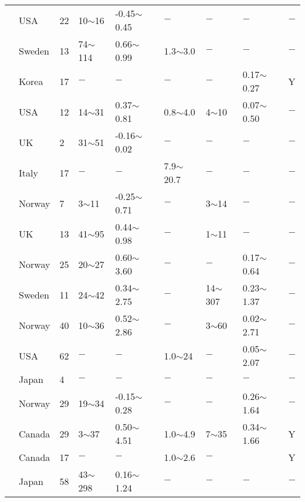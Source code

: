 {\begin{longtable}{lllllllll}
    \citet{Holtz19721223} & USA   & 22    & 10$\sim$16 & -0.45$\sim$0.45 & $-$     & $-$     & $-$     & $-$ \\
    \citet{Holtz197979} & Sweden & 13    & 74$\sim$114 & 0.66$\sim$0.99 & 1.3$\sim$3.0 & $-$     & $-$     & $-$ \\
    \citet{Hong20102} & Korea & 17    & $-$     & $-$     & $-$     & $-$     & 0.17$\sim$0.27 & Y \\
    \citet{Horn1964215} & USA   & 12    & 14$\sim$31 & 0.37$\sim$0.81 & 0.8$\sim$4.0 & 4$\sim$10  & 0.07$\sim$0.50 & $-$ \\
    \citet{Hutchinson19696} & UK    & 2     & 31$\sim$51 & -0.16$\sim$0.02 & $-$     & $-$     & $-$     & $-$ \\
    \citet{Jamiolkowski1988263} & Italy & 17    & $-$     & $-$     & 7.9$\sim$20.7 & $-$     & $-$     & $-$ \\
    \citet{Janbu197795} & Norway & 7     & 3$\sim$11  & -0.25$\sim$0.71 & $-$     & 3$\sim$14  & $-$     & $-$ \\
    \citet{Jardine2003599} & UK    & 13    & 41$\sim$95 & 0.44$\sim$0.98 & $-$     & 1$\sim$11  & $-$     & $-$ \\
    \citet{Karlsrud1976157} & Norway & 25    & 20$\sim$27 & 0.60$\sim$3.60 & $-$     & $-$     & 0.17$\sim$0.64 & $-$ \\
    \citet{Karlsson196735} & Sweden & 11    & 24$\sim$42 & 0.34$\sim$2.75 & $-$     & 14$\sim$307 & 0.23$\sim$1.37 & $-$ \\
    \citet{Kenney1966} & Norway & 40    & 10$\sim$36 & 0.52$\sim$2.86 & $-$     & 3$\sim$60  & 0.02$\sim$2.71 & $-$ \\
    \citet{Kinner1970} & USA   & 62    & $-$     & $-$     & 1.0$\sim$24 & $-$     & 0.05$\sim$2.07 & $-$ \\
    \citet{Kitago1976239} & Japan & 4     & $-$     & $-$     & $-$     & $-$     & $-$     & $-$ \\
    \citet{Kjekstad198150} & Norway & 29    & 19$\sim$34 & -0.15$\sim$0.28 & $-$     & $-$     & 0.26$\sim$1.64 & $-$ \\
    \citet{Konrad1987392} & Canada & 29    & 3$\sim$37  & 0.50$\sim$4.51 & 1.0$\sim$4.9 & 7$\sim$35  & 0.34$\sim$1.66 & Y \\
    \citet{Konrad1987177} & Canada & 17    & $-$     & $-$     & 1.0$\sim$2.6 & $-$     &       & Y \\
    \citet{Koumoto199095} & Japan & 58    & 43$\sim$298 & 0.16$\sim$1.24 & $-$     & $-$     & $-$     & $-$ \\

\end{longtable}}
